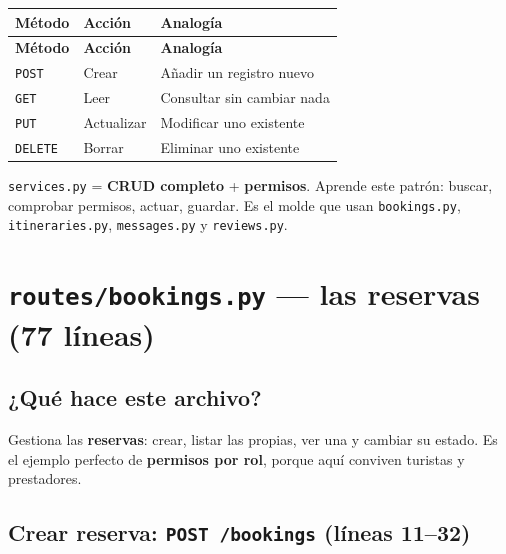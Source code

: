 \documentclass[11pt,a4paper]{article}
\begin{document}
\begin{center}
{\small
\setlength{\tabcolsep}{4pt}
\begin{longtable}{@{}>{\raggedright\arraybackslash}p{3.2cm}>{\raggedright\arraybackslash}p{4.2cm}>{\raggedright\arraybackslash}p{7.5cm}@{}}
\toprule
\textbf{Método} & \textbf{Acción} & \textbf{Analogía} \\
\midrule
\endfirsthead
\toprule
\textbf{Método} & \textbf{Acción} & \textbf{Analogía} \\
\midrule
\endhead
\texttt{POST} & Crear & Añadir un registro nuevo \\
\texttt{GET} & Leer & Consultar sin cambiar nada \\
\texttt{PUT} & Actualizar & Modificar uno existente \\
\texttt{DELETE} & Borrar & Eliminar uno existente \\
\bottomrule
\end{longtable}
}
\end{center}

\begin{recuadro}
\texttt{services.py} = \textbf{CRUD completo} + \textbf{permisos}. Aprende este patrón:
buscar, comprobar permisos, actuar, guardar. Es el molde que usan \texttt{bookings.py},
\texttt{itineraries.py}, \texttt{messages.py} y \texttt{reviews.py}.
\end{recuadro}

\section{\texttt{routes/bookings.py} --- las reservas (77 líneas)}

\subsection{¿Qué hace este archivo?}

Gestiona las \textbf{reservas}: crear, listar las propias, ver una y cambiar su estado.
Es el ejemplo perfecto de \textbf{permisos por rol}, porque aquí conviven turistas y prestadores.

\subsection{Crear reserva: \texttt{POST /bookings} (líneas 11--32)}
\end{document}
